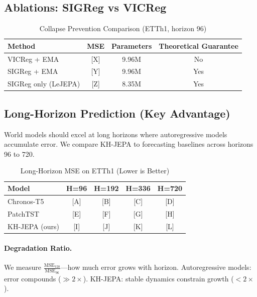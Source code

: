 \documentclass{article}
\begin{document}
\subsection{Ablations: SIGReg vs VICReg}

\begin{table}[h]
\centering
\caption{Collapse Prevention Comparison (ETTh1, horizon 96)}
\small
\begin{tabular}{@{}lccc@{}}
\toprule
\textbf{Method} & \textbf{MSE} & \textbf{Parameters} & \textbf{Theoretical Guarantee} \\
\midrule
VICReg + EMA & [X] & 9.96M & No \\
SIGReg + EMA & [Y] & 9.96M & Yes \\
SIGReg only (LeJEPA) & [Z] & 8.35M & Yes \\
\bottomrule
\end{tabular}
\end{table}

\subsection{Long-Horizon Prediction (Key Advantage)}

World models should excel at long horizons where autoregressive models accumulate error. We compare KH-JEPA to forecasting baselines across horizons 96 to 720.

\begin{table}[h]
\centering
\caption{Long-Horizon MSE on ETTh1 (Lower is Better)}
\small
\begin{tabular}{@{}lcccc@{}}
\toprule
\textbf{Model} & \textbf{H=96} & \textbf{H=192} & \textbf{H=336} & \textbf{H=720} \\
\midrule
Chronos-T5 & [A] & [B] & [C] & [D] \\
PatchTST & [E] & [F] & [G] & [H] \\
KH-JEPA (ours) & [I] & [J] & [K] & [L] \\
\bottomrule
\end{tabular}
\end{table}

\paragraph{Degradation Ratio.} We measure $\frac{\text{MSE}_{720}}{\text{MSE}_{96}}$—how much error grows with horizon. Autoregressive models: error compounds ($\gg 2\times$). KH-JEPA: stable dynamics constrain growth ($< 2\times$).
\end{document}
